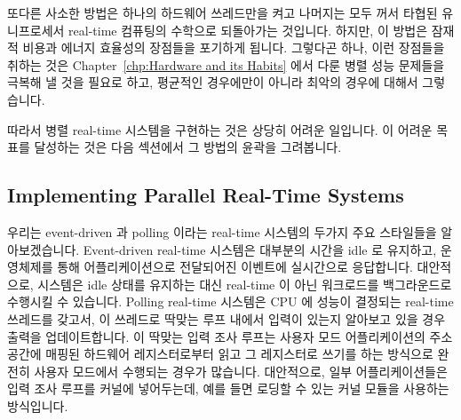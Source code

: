 또다른 사소한 방법은 하나의 하드웨어 쓰레드만을 켜고 나머지는 모두 꺼서 타협된
유니프로세서 real-time 컴퓨팅의 수학으로 되돌아가는 것입니다.
하지만, 이 방법은 잠재적 비용과 에너지 효율성의 장점들을 포기하게 됩니다.
그렇다곤 하나, 이런 장점들을 취하는 것은
Chapter~\ref{chp:Hardware and its Habits} 에서 다룬 병렬 성능 문제들을 극복해
낼 것을 필요로 하고, 평균적인 경우에만이 아니라 최악의 경우에 대해서
그렇습니다.

따라서 병렬 real-time 시스템을 구현하는 것은 상당히 어려운 일입니다.
이 어려운 목표를 달성하는 것은 다음 섹션에서 그 방법의 윤곽을 그려봅니다.

\subsection{Implementing Parallel Real-Time Systems}
\label{sec:advsync:Implementing Parallel Real-Time Systems}

우리는 event-driven 과 polling 이라는 real-time 시스템의 두가지 주요 스타일들을
알아보겠습니다.
Event-driven real-time 시스템은 대부분의 시간을 idle 로 유지하고, 운영체제를
통해 어플리케이션으로 전달되어진 이벤트에 실시간으로 응답합니다.
대안적으로, 시스템은 idle 상태를 유지하는 대신 real-time 이 아닌 워크로드를
백그라운드로 수행시킬 수 있습니다.
Polling real-time 시스템은 CPU 에 성능이 결정되는 real-time 쓰레드를 갖고서, 이
쓰레드로 딱맞는 루프 내에서 입력이 있는지 알아보고 있을 경우 출력을
업데이트합니다.
이 딱맞는 입력 조사 루프는 사용자 모드 어플리케이션의 주소 공간에 매핑된
하드웨어 레지스터로부터 읽고 그 레지스터로 쓰기를 하는 방식으로 완전히 사용자
모드에서 수행되는 경우가 많습니다.
대안적으로, 일부 어플리케이션들은 입력 조사 루프를 커널에 넣어두는데, 예를 들면
로딩할 수 있는 커널 모듈을 사용하는 방식입니다.

